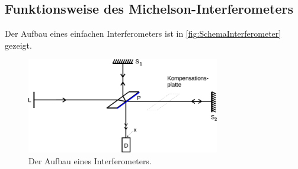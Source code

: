 \subsection{Funktionsweise des Michelson-Interferometers}

    Der Aufbau eines einfachen Interferometers ist in \autoref{fig:SchemaInterferometer} gezeigt.

    \begin{figure}
        \centering
        \includegraphics[width=0.75\textwidth]{content/img/Abb_4.pdf}
        \caption{Der Aufbau eines Interferometers.}
        \label{fig:SchemaInterferometer}
    \end{figure}

